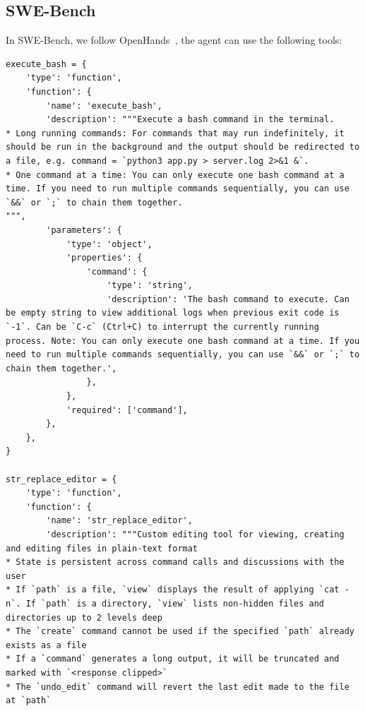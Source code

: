 \subsection{SWE-Bench}
In SWE-Bench, we follow OpenHands~\citep{OpenHands2025}, the agent can use the following tools:
{\footnotesize
\begin{Verbatim}[breaklines, breakanywhere]
execute_bash = {
    'type': 'function',
    'function': {
        'name': 'execute_bash',
        'description': """Execute a bash command in the terminal.
* Long running commands: For commands that may run indefinitely, it should be run in the background and the output should be redirected to a file, e.g. command = `python3 app.py > server.log 2>&1 &`.
* One command at a time: You can only execute one bash command at a time. If you need to run multiple commands sequentially, you can use `&&` or `;` to chain them together.
""",
        'parameters': {
            'type': 'object',
            'properties': {
                'command': {
                    'type': 'string',
                    'description': 'The bash command to execute. Can be empty string to view additional logs when previous exit code is `-1`. Can be `C-c` (Ctrl+C) to interrupt the currently running process. Note: You can only execute one bash command at a time. If you need to run multiple commands sequentially, you can use `&&` or `;` to chain them together.',
                },
            },
            'required': ['command'],
        },
    },
}

str_replace_editor = {
    'type': 'function',
    'function': {
        'name': 'str_replace_editor',
        'description': """Custom editing tool for viewing, creating and editing files in plain-text format
* State is persistent across command calls and discussions with the user
* If `path` is a file, `view` displays the result of applying `cat -n`. If `path` is a directory, `view` lists non-hidden files and directories up to 2 levels deep
* The `create` command cannot be used if the specified `path` already exists as a file
* If a `command` generates a long output, it will be truncated and marked with `<response clipped>`
* The `undo_edit` command will revert the last edit made to the file at `path`


\end{Verbatim}}
